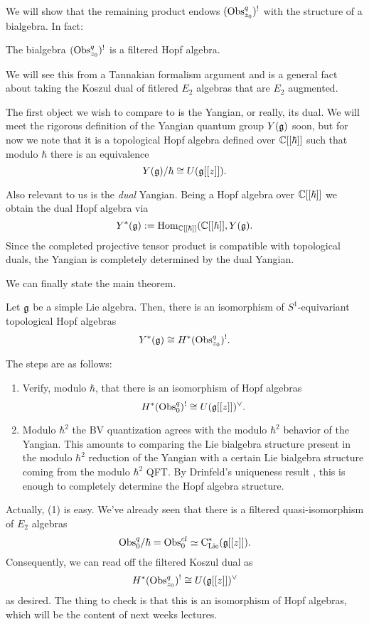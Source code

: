 \documentclass[11pt]{amsart}
\begin{document}
We will show that the remaining product endows $({\rm Obs}^q_{z_0})^{!}$ with the structure of a bialgebra. 
In fact:

\begin{prop}
The bialgebra $({\rm Obs}^q_{z_0})^{!}$ is a filtered Hopf algebra. 
\end{prop}

We will see this from a Tannakian formalism argument and is a general fact about taking the Koszul dual of fitlered $E_2$ algebras that are $E_2$ augmented. 

The first object we wish to compare to is the Yangian, or really, its dual. 
We will meet the rigorous definition of the Yangian quantum group $Y(\mathfrak g)$ soon, but for now we note that it is a topological Hopf algebra defined over $\mathbb C[[\hbar]]$ such that modulo $\hbar$ there is an equivalence
\[
Y(\mathfrak g) / \hbar \cong U(\mathfrak g[[z]]) .
\] 

Also relevant to us is the {\em dual} Yangian. 
Being a Hopf algebra over $\mathbb C[[\hbar]]$ we obtain the dual Hopf algebra via
\[
Y^*(\mathfrak g) := {\rm Hom}_{\mathbb C[[\hbar]]} (\mathbb C[[\hbar]], Y(\mathfrak g) .
\] 
Since the completed projective tensor product is compatible with topological duals, the Yangian is completely determined by the dual Yangian. 

We can finally state the main theorem. 

\begin{thm}  \label{thm: yangian}
Let $\mathfrak g$ be a simple Lie algebra. 
Then, there is an isomorphism of $S^1$-equivariant topological Hopf algebras
\[
Y^*(\mathfrak g) \cong H^*({\rm Obs}^q_{z_0})^{!} .
\] 
\end{thm}

The steps are as follows:
\begin{enumerate}
\item Verify, modulo $\hbar$, that there is an isomorphism of Hopf algebras
\[
H^*({\rm Obs}^q_{0})^{!} \cong U(\mathfrak g[[z]])^\vee .
\] 

\item Modulo $\hbar^2$ the BV quantization agrees with the modulo $\hbar^2$ behavior of the Yangian. 
This amounts to comparing the Lie bialgebra structure present in the modulo $\hbar^2$ reduction of the Yangian with a certain Lie bialgebra structure coming from the modulo $\hbar^2$ QFT. 
By Drinfeld's uniqueness result \cite{Drinfeld1}, this is enough to completely determine the Hopf algebra structure. 
\end{enumerate}

Actually, (1) is easy. 
We've already seen that there is a filtered quasi-isomorphism of $E_2$ algebras
\[
{\rm Obs}_{0}^{q} / \hbar = {\rm Obs}^{cl}_{0} \simeq {\rm C}_{{\rm Lie}}^*(\mathfrak g[[z]]) .
\] 
Consequently, we can read off the filtered Koszul dual as
\[
H^*({\rm Obs}^q_{z_0})^{!} \cong U(\mathfrak g[[z]])^\vee
\]
as desired. 
The thing to check is that this is an isomorphism of Hopf algebras, which will be the content of next weeks lectures. 
\end{document}
